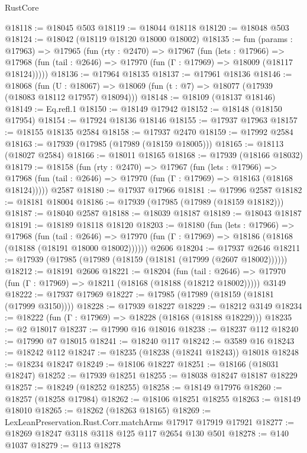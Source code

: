 \begin{lexlean}{RustCore}
\begin{coremodule}
@18118 := @18045 @503
@18119 := @18044 @18118
@18120 := @18048 @503
@18124 := @18042 (@18119 @18120 @18000 @18002)
@18135 := fun (params : @17963) =>
  @17965
    (fun (rty : @2470) =>
    @17967
      (fun (lets : @17966) =>
      @17968 (fun (tail : @2646) => @17970 (fun (Γ : @17969) => @18009 (@18117 @18124)))))
@18136 := @17964 @18135
@18137 := @17961 @18136
@18146 := @18068
    (fun (U : @18067) => @18069 (fun (t : @7) => @18077 (@17939 (@18083 @18112 @17957) @18094)))
@18148 := @18109 (@18137 @18146)
@18149 := Eq.refl.{1}
@18150 := @18149 @17942
@18152 := @18148 (@18150 @17954)
@18154 := @17924 @18136 @18146
@18155 := @17937 @17963
@18157 := @18155 @18135 @2584
@18158 := @17937 @2470
@18159 := @17992 @2584
@18163 := @17939 (@17985 (@17989 (@18159 @18005)))
@18165 := @18113 (@18027 @2584)
@18166 := @18011 @18165
@18168 := @17939 (@18166 @18032)
@18179 := @18158
    (fun (rty : @2470) =>
    @17967
      (fun (lets : @17966) =>
      @17968 (fun (tail : @2646) => @17970 (fun (Γ : @17969) => @18163 (@18168 @18124)))))
    @2587
@18180 := @17937 @17966
@18181 := @17996 @2587
@18182 := @18181 @18004
@18186 := @17939 (@17985 (@17989 (@18159 @18182)))
@18187 := @18040 @2587
@18188 := @18039 @18187
@18189 := @18043 @18187
@18191 := @18189 @18118 @18120
@18203 := @18180
    (fun (lets : @17966) =>
    @17968
      (fun (tail : @2646) =>
      @17970 (fun (Γ : @17969) => @18186 (@18168 (@18188 (@18191 @18000 @18002))))))
    @2606
@18204 := @17937 @2646
@18211 := @17939 (@17985 (@17989 (@18159 (@18181 (@17999 (@2607 @18002))))))
@18212 := @18191 @2606
@18221 := @18204
    (fun (tail : @2646) => @17970 (fun (Γ : @17969) => @18211 (@18168 (@18188 (@18212 @18002)))))
    @3149
@18222 := @17937 @17969
@18227 := @17985 (@17989 (@18159 (@18181 (@17999 @3150))))
@18228 := @17939 @18227
@18229 := @18212 @3149
@18234 := @18222 (fun (Γ : @17969) => @18228 (@18168 (@18188 @18229)))
@18235 := @2 @18017
@18237 := @17990 @16 @18016
@18238 := @18237 @112
@18240 := @17990 @7 @18015
@18241 := @18240 @117
@18242 := @3589 @16
@18243 := @18242 @112
@18247 := @18235 (@18238 (@18241 @18243)) @18018
@18248 := @18234 @18247
@18249 := @18106 @18227
@18251 := @18166 (@18031 @18247)
@18252 := @17939 @18251
@18255 := @18038 @18247 @18187 @18229
@18257 := @18249 (@18252 @18255)
@18258 := @18149 @17976
@18260 := @18257 (@18258 @17984)
@18262 := @18106 @18251 @18255
@18263 := @18149 @18010
@18265 := @18262 (@18263 @18165)
@18269 := LexLeanPreservation.Rust.Corr.matchArms @17917 @17919 @17921
@18277 := @18269 @18247 @3118 @3118 @125 @117 @2654 @130 @501
@18278 := @140 @1037
@18279 := @113 @18278

\end{coremodule}
\end{lexlean}
